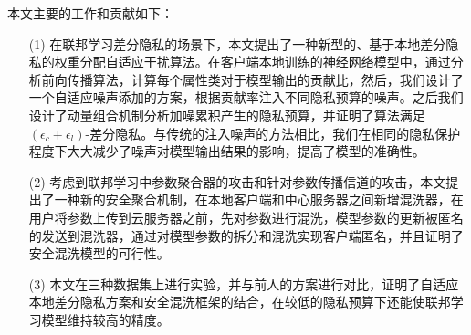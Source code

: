 本文主要的工作和贡献如下：
\begin{enumerate}
\item [(1)] 在联邦学习差分隐私的场景下，本文提出了一种新型的、基于本地差分隐私的权重分配自适应干扰算法。在客户端本地训练的神经网络模型中，通过分析前向传播算法，计算每个属性类对于模型输出的贡献比，然后，我们设计了一个自适应噪声添加的方案，根据贡献率注入不同隐私预算的噪声。之后我们设计了动量组合机制分析加噪累积产生的隐私预算，并证明了算法满足$\left(\epsilon_{c}+\epsilon_{l}\right)$-差分隐私。与传统的注入噪声的方法相比，我们在相同的隐私保护程度下大大减少了噪声对模型输出结果的影响，提高了模型的准确性。
\item [(2)] 考虑到联邦学习中参数聚合器的攻击和针对参数传播信道的攻击，本文提出了一种新的安全聚合机制，在本地客户端和中心服务器之间新增混洗器，在用户将参数上传到云服务器之前，先对参数进行混洗，模型参数的更新被匿名的发送到混洗器，通过对模型参数的拆分和混洗实现客户端匿名，并且证明了安全混洗模型的可行性。
\item [(3)] 本文在三种数据集上进行实验，并与前人的方案进行对比，证明了自适应本地差分隐私方案和安全混洗框架的结合，在较低的隐私预算下还能使联邦学习模型维持较高的精度。
\end{enumerate}
\hspace{-0.5cm}
 
